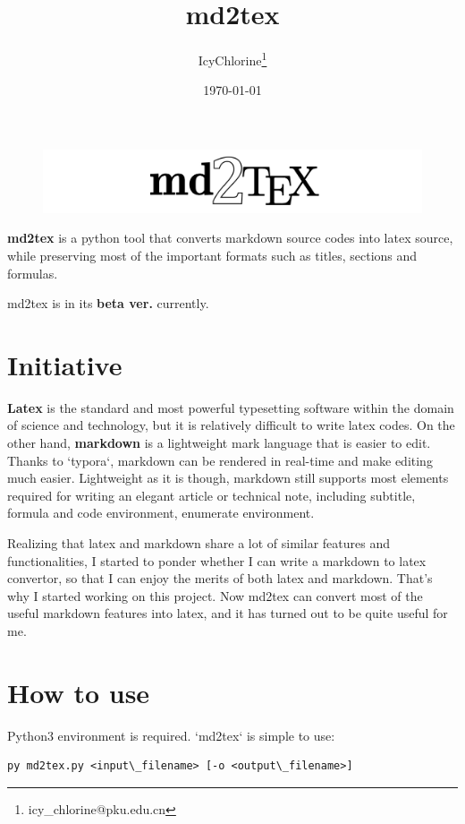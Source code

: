 \documentclass[UTF8]{ctexart}
\title{md2tex}
\author{IcyChlorine\footnote{icy\_chlorine@pku.edu.cn}}
\date{\today}
\begin{document}
	\maketitle


\begin{figure}[H]
	\centering
	\includegraphics[width=1.\textwidth]{md2tex.png}
	\caption{}
\end{figure}


\textbf{md2tex} is a python tool that converts markdown source codes into latex source, while preserving most of the important formats such as titles, sections and formulas.

md2tex is in its \textbf{beta ver.} currently.

\section{Initiative}

\textbf{Latex} is the standard and most powerful typesetting software within the domain of science and technology, but it is relatively difficult to write latex codes. On the other hand, \textbf{markdown} is a lightweight mark language that is easier to edit. Thanks to `typora`, markdown can be rendered in real-time and make editing much easier. Lightweight as it is though, markdown still supports most elements required for writing an elegant article or technical note, including subtitle, formula and code environment, enumerate environment. 

Realizing that latex and markdown share a lot of similar features and functionalities, I started to ponder whether I can write a markdown to latex convertor, so that I can enjoy the merits of both latex and markdown. That's why I started working on this project. Now md2tex can convert most of the useful markdown features into latex, and it has turned out to be quite useful for me.

\section{How to use}

Python3 environment is required. `md2tex` is simple to use: 

\begin{lstlisting}
py md2tex.py <input\_filename> [-o <output\_filename>]
\end{lstlisting}
\end{document}
